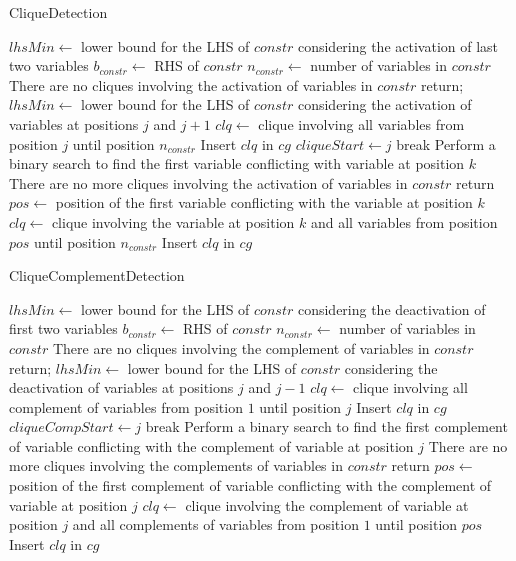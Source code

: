 \documentclass[preprint,12pt]{elsarticle}
\begin{document}
\begin{algorithm}\label{algClqDetection}
\caption{CliqueDetection}
$lhsMin \gets$ lower bound for the LHS of $constr$ considering the activation of last two variables\;
$b_{constr} \gets$ RHS of $constr$\;
$n_{constr} \gets$ number of variables in $constr$\;
{
	There are no cliques involving the activation of variables in $constr$\;
	return;
}
{
	$lhsMin \gets$ lower bound for the LHS of $constr$ considering the activation of variables at positions $j$ and $j + 1$\;
	{
		$clq \gets$ clique involving all variables from position $j$ until position $n_{constr}$\;
		Insert $clq$ in $cg$\;
		$cliqueStart \gets j$\;
		break\;
	}
}
{
	Perform a binary search to find the first variable conflicting with variable at position $k$\;
	{
		There are no more cliques involving the activation of variables in $constr$\;
		return\;
	}
	$pos \gets$ position of the first variable conflicting with the variable at position $k$\;
	$clq \gets$ clique involving the variable at position $k$ and all variables from position $pos$ until position $n_{constr}$\;
	Insert $clq$ in $cg$\;
}
\end{algorithm}

\begin{algorithm}\label{algClqCompDetection}
\caption{CliqueComplementDetection}
$lhsMin \gets$ lower bound for the LHS of $constr$ considering the deactivation of first two variables\;
$b_{constr} \gets$ RHS of $constr$\;
$n_{constr} \gets$ number of variables in $constr$\;
{
	There are no cliques involving the complement of variables in $constr$\;
	return;
}
{
	$lhsMin \gets$ lower bound for the LHS of $constr$ considering the deactivation of variables at positions $j$ and $j - 1$\;
	{
		$clq \gets$ clique involving all complement of variables from position $1$ until position $j$\;
		Insert $clq$ in $cg$\;
		$cliqueCompStart \gets j$\;
		break\;
	}
}
{
	Perform a binary search to find the first complement of variable conflicting with the complement of variable at position $j$\;
	{
		There are no more cliques involving the complements of variables in $constr$\;
		return\;
	}
	$pos \gets$ position of the first complement of variable conflicting with the complement of variable at position $j$\;
	$clq \gets$ clique involving the complement of variable at position $j$ and all complements of variables from position $1$ until position $pos$\;
	Insert $clq$ in $cg$\;
}
\end{algorithm}
\end{document}

